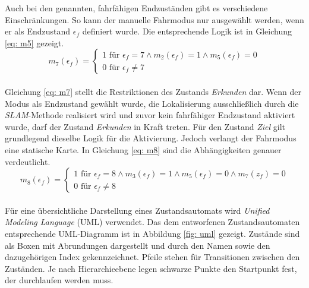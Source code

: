 		Auch bei den genannten, fahrfähigen Endzuständen gibt es verschiedene Einschränkungen. So kann der manuelle Fahrmodus nur ausgewählt werden, wenn er als Endzustand $\epsilon_f$ definiert wurde. Die entsprechende Logik ist in Gleichung \ref{eq: m5} gezeigt.\\
		
				\begin{equation}
					m_7(\epsilon_f)=\left\{\begin{array}{ll} 1 \text{ für } \epsilon_f=7 \wedge m_2(\epsilon_f)=1 \wedge m_5(\epsilon_f)=0 \\
						0 \text{ für }\epsilon_f\neq 7\end{array}\right.
					\label{eq: m7}
				\end{equation}\\
				
		Gleichung \ref{eq: m7} stellt die Restriktionen des Zustands \textit{Erkunden} dar. Wenn der Modus als Endzustand gewählt wurde, die Lokalisierung ausschließlich durch die \textit{SLAM}-Methode realisiert wird und zuvor kein fahrfähiger Endzustand aktiviert wurde, darf der Zustand \textit{Erkunden} in Kraft treten. Für den Zustand \textit{Ziel} gilt grundlegend dieselbe Logik für die Aktivierung. Jedoch verlangt der Fahrmodus eine statische Karte. In Gleichung \ref{eq: m8} sind die Abhängigkeiten genauer verdeutlicht.\\
		
		
				\begin{equation}
					m_8(\epsilon_f)=\left\{\begin{array}{ll} 1 \text{ für } \epsilon_f=8 \wedge m_3(\epsilon_f)=1 \wedge m_5(\epsilon_f)=0 \wedge m_7(z_f)=0 \\
						0 \text{ für }\epsilon_f\neq 8\end{array}\right.
					\label{eq: m8}
				\end{equation}\\
		
		Für eine übersichtliche Darstellung eines Zustandsautomats wird \textit{Unified Modeling Language} (UML) verwendet. Das dem entworfenen Zustandsautomaten entsprechende UML-Diagramm ist in Abbildung \ref{fig: uml} gezeigt. Zustände sind als Boxen mit Abrundungen dargestellt und durch den Namen sowie den dazugehörigen Index gekennzeichnet. Pfeile stehen für Transitionen zwischen den Zuständen. Je nach Hierarchieebene legen schwarze Punkte den Startpunkt fest, der durchlaufen werden muss. 
		
	
	
